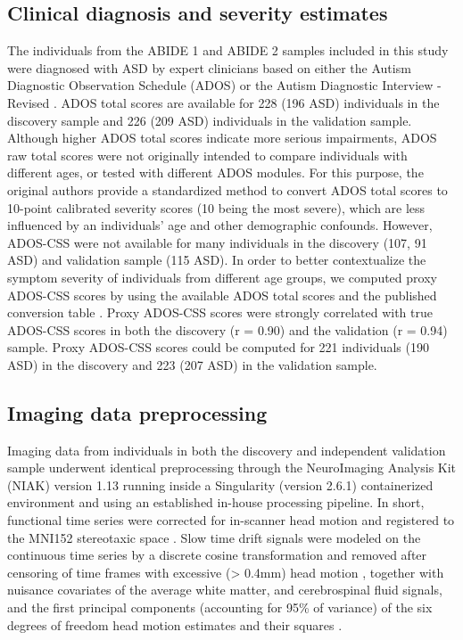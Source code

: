 \documentclass[9pt,lineno]{elife}
\begin{document}
\subsection{Clinical diagnosis and severity estimates}
The individuals from the ABIDE 1 and ABIDE 2 samples included in this study were diagnosed with ASD by expert clinicians based on either the Autism Diagnostic Observation Schedule (ADOS) \citep{Lord2000-vw,Gotham2007-dz,Lord2012-fi} or the Autism Diagnostic Interview - Revised \citep{Lord1994-id}. ADOS total scores are available for 228 (196 ASD) individuals in the discovery sample and 226 (209 ASD) individuals in the validation sample. Although higher ADOS total scores indicate more serious impairments, ADOS raw total scores were not originally intended to compare individuals with different ages, or tested with different ADOS modules. For this purpose, the original authors provide a standardized method \citep{Gotham2009-mi} to convert ADOS total scores to 10-point calibrated severity scores (10 being the most severe), which are less influenced by an individuals’ age and other demographic confounds. However, ADOS-CSS were not available for many individuals in the discovery (107, 91 ASD) and validation sample (115 ASD). In order to better contextualize the symptom severity of individuals from different age groups, we computed proxy ADOS-CSS scores by using the available ADOS total scores and the published conversion table \citep{Moradi2017-cj}. Proxy ADOS-CSS scores were strongly correlated with true ADOS-CSS scores in both the discovery (r = 0.90) and the validation (r = 0.94) sample. Proxy ADOS-CSS scores could be computed for 221 individuals (190 ASD) in the discovery and 223 (207 ASD) in the validation sample.

\subsection{Imaging data preprocessing}
Imaging data from individuals in both the discovery and independent validation sample underwent identical preprocessing through the NeuroImaging Analysis Kit (NIAK) version 1.13 \citep{Bellec2011-cr} running inside a Singularity (version 2.6.1) containerized environment \citep{Kurtzer2017-qb} and using an established in-house processing pipeline. In short, functional time series were corrected for in-scanner head motion and registered to the MNI152 stereotaxic space \citep{Evans1994-ek}. Slow time drift signals were modeled on the continuous time series by a discrete cosine transformation and removed after censoring of time frames with excessive (> 0.4mm) head motion \citep{Power2012-nn}, together with nuisance covariates of the average white matter, and cerebrospinal fluid signals, and the first principal components (accounting for 95\% of variance) of the six degrees of freedom head motion estimates and their squares \citep{Giove2009-eh}.
\end{document}
